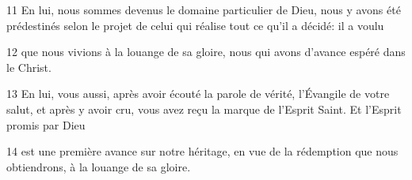 
11 En lui, nous sommes devenus le domaine particulier de Dieu, nous y avons été prédestinés selon le projet de celui qui réalise tout ce qu’il a décidé: il a voulu

12 que nous vivions à la louange de sa gloire, nous qui avons d’avance espéré dans le Christ.

13 En lui, vous aussi, après avoir écouté la parole de vérité, l’Évangile de votre salut, et après y avoir cru, vous avez reçu la marque de l’Esprit Saint. Et l’Esprit promis par Dieu

14 est une première avance sur notre héritage, en vue de la rédemption que nous obtiendrons, à la louange de sa gloire.